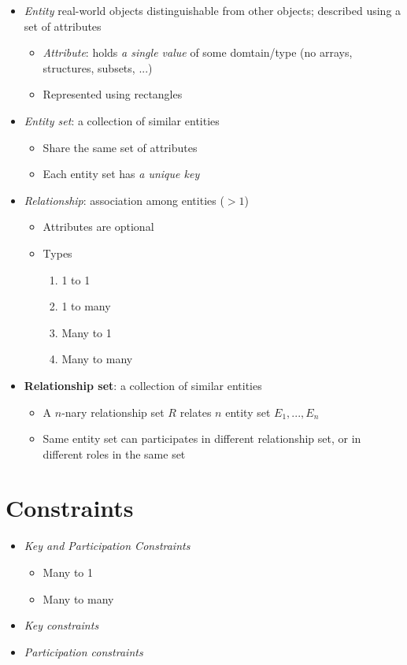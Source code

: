   \begin{itemize}
    \item \emph{Entity} real-world objects distinguishable from other objects;
    described using a set of attributes
    \begin{itemize}
      \item \emph{Attribute}: holds \emph{a single value} of some
      domtain/type (no arrays, structures, subsets, ...)
      \item Represented using rectangles
    \end{itemize}

    \item \emph{Entity set}: a collection of similar entities
    \begin{itemize}
      \item Share the same set of attributes
      \item Each entity set has \emph{a unique key}
    \end{itemize}

    \item \emph{Relationship}: association among entities ($ > 1 $)
    \begin{itemize}
      \item Attributes are optional
      \item Types
      \begin{enumerate}
        \item 1 to 1
        \item 1 to many
        \item Many to 1
        \item Many to many
      \end{enumerate}
    \end{itemize}

    \item \textbf{Relationship set}: a collection of similar entities
    \begin{itemize}
      \item A $ n $-nary relationship set $ R $ relates $ n $ entity set
      $ E_{1}, ..., E_{n} $
      \item Same entity set can participates in different relationship set,
      or in different roles in the same set
    \end{itemize}
  \end{itemize}

\section{Constraints}

  \begin{itemize}
    \item \emph{Key and Participation Constraints}
    \begin{itemize}
      \item Many to 1
      \item Many to many
    \end{itemize}

    \item \emph{Key constraints}
    \item \emph{Participation constraints}
  \end{itemize}
